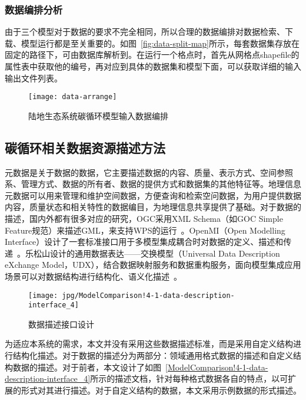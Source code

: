 \subsubsection{数据编排分析}
\label{subsubsec:data-arrange}
由于三个模型对于数据的要求不完全相同，所以合理的数据编排对数据检索、下载、模型运行都是至关重要的。如图~\ref{fig:data-split-map}所示，每套数据集存放在固定的路径下，可由数据库解析到。在运行一个格点时，首先从网格点shapefile的属性表中获取他的编号，再对应到具体的数据集和模型下面，可以获取详细的输入输出文件列表。

\begin{figure}[!htbp]
    \centering
    \texttt{[image: data-arrange]}
    \caption{陆地生态系统碳循环模型输入数据编排}
    \label{fig:data-arrange}
\end{figure}

\subsection{碳循环相关数据资源描述方法}
\label{sec:data-desc}
元数据是关于数据的数据，它主要描述数据的内容、质量、表示方式、空间参照系、管理方式、数据的所有者、数据的提供方式和数据集的其他特征等。地理信息元数据可以用来管理和维护空间数据，方便查询和检索空问数据，为用户提供数据内容，质量状态和相关特性的数据编目，为地理信息共享提供了基础。对于数据的描述，国内外都有很多对应的研究，OGC采用XML Schema（如GOC Simple Feature规范）来描述GML，来支持WPS的运行~\cite{OGC-WPS}。OpenMI（Open Modelling Interface）设计了一套标准接口用于多模型集成耦合时对数据的定义、描述和传递~\cite{MOORE2005279}。乐松山设计的通用数据表达——交换模型（Universal Data Description eXchange Model，UDX），结合数据映射服务和数据重构服务，面向模型集成应用场景可以对数据结构进行结构化、语义化描述~\cite{乐松山2016面向地理模型共享与集成的数据适配方法研究}。

\begin{figure}[!htbp]
    \centering
    \texttt{[image: jpg/ModelComparison!4-1-data-description-interface\_4]}
    \caption{数据描述接口设计}
    \label{fig:ModelComparison!4-1-data-description-interface_4}
\end{figure}

为适应本系统的需求，本文并没有采用这些数据描述标准，而是采用自定义结构进行结构化描述。对于数据的描述分为两部分：领域通用格式数据的描述和自定义结构数据的描述。对于前者，本文设计了如图~\ref{ModelComparison!4-1-data-description-interface_4}所示的描述文档，针对每种格式数据各自的特点，以可扩展的形式对其进行描述。对于自定义结构的数据，本文采用示例数据的形式描述。

